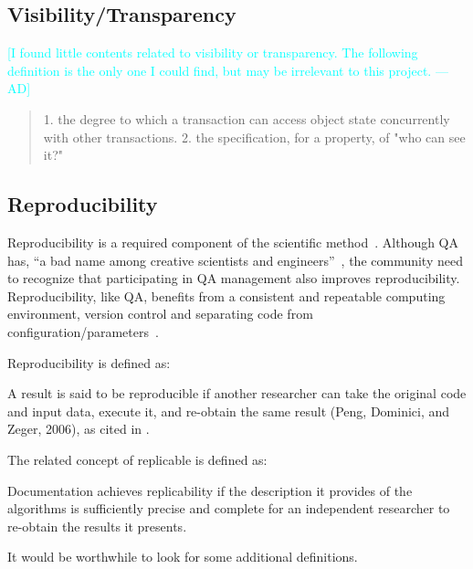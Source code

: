 \documentclass[letterpaper,cleveref]{lipics-v2019}
\newcommand{\authornote}[3]{\textcolor{#1}{[#3 ---#2]}}
\newcommand{\authornote}[3]{}
\newcommand{\ad}[1]{\authornote{cyan}{AD}{#1}} %
\theoremstyle{definition}
\begin{document}
\subsection{Visibility/Transparency}
    \ad{I found little contents related to visibility or transparency. The following definition is the only one I could find, but may be irrelevant to this project.}
    \begin{quotation}
        1. the degree to which a transaction can access object state concurrently with other transactions. 2. the specification, for a property, of "who can see it?"~\cite{ISO/IEC/IEEE24765}
    \end{quotation}
      
\subsection{Reproducibility}

Reproducibility is a required component of the scientific
method~\cite{Davison2012}.  Although QA has, ``a bad name among creative
scientists and engineers''~\cite[p.~352]{Roache1998}, the community need to
recognize that participating in QA management also improves reproducibility.
Reproducibility, like QA, benefits from a consistent and repeatable computing
environment, version control and separating code from
configuration/parameters~\cite{Davison2012}.

Reproducibility is defined as:

A result is said to be reproducible if another researcher can take the original
code and input data, execute it, and re-obtain the same result (Peng, Dominici,
and Zeger, 2006), as cited in \citet{BenureauAndRougier2017}.

The related concept of replicable is defined as:

Documentation achieves replicability if the description it provides of the
algorithms is sufficiently precise and complete for an independent researcher to
re-obtain the results it presents.  \citep{BenureauAndRougier2017}

It would be worthwhile to look for some additional definitions.
\end{document}
